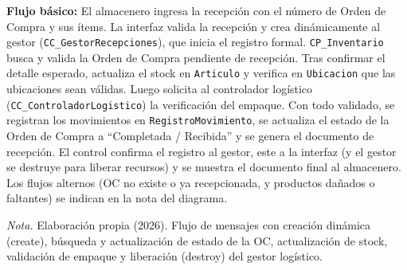 \documentclass[12pt,a4paper]{article}
\newcommand{\lf}{\scriptsize}
\begin{document}
\begin{landscape}
\begin{minipage}[t]{0.38\linewidth}
\smallskip
\textbf{Flujo b\'asico:} El almacenero ingresa la recepci\'on con el n\'umero de Orden de Compra y sus \'items. La interfaz valida la recepci\'on y crea din\'amicamente al gestor (\texttt{CC\_GestorRecepciones}), que inicia el registro formal. \texttt{CP\_Inventario} busca y valida la Orden de Compra pendiente de recepci\'on. Tras confirmar el detalle esperado, actualiza el stock en \texttt{Articulo} y verifica en \texttt{Ubicacion} que las ubicaciones sean v\'alidas. Luego solicita al controlador log\'istico (\texttt{CC\_ControladorLogistico}) la verificaci\'on del empaque. Con todo validado, se registran los movimientos en \texttt{RegistroMovimiento}, se actualiza el estado de la Orden de Compra a ``Completada / Recibida'' y se genera el documento de recepci\'on. El control confirma el registro al gestor, este a la interfaz (y el gestor se destruye para liberar recursos) y se muestra el documento final al almacenero. Los flujos alternos (OC no existe o ya recepcionada, y productos da\~nados o faltantes) se indican en la nota del diagrama.
\end{minipage}\hfill
\begin{minipage}[t]{0.60\linewidth}
\vspace{0pt}
\centering
{}
\label{fig:seq_cus04}
\renewcommand{\lf}{\scriptsize}
\resizebox{!}{0.48\textheight}{}
\par\vspace{0.5ex}
{\raggedright \small \emph{Nota.} Elaboraci\'on propia (2026). Flujo de mensajes con creaci\'on din\'amica (\guillemotleft create\guillemotright), b\'usqueda y actualizaci\'on de estado de la OC, actualizaci\'on de stock, validaci\'on de empaque y liberaci\'on (\guillemotleft destroy\guillemotright) del gestor log\'istico.\par}
\end{minipage}

\end{landscape}
\end{document}
